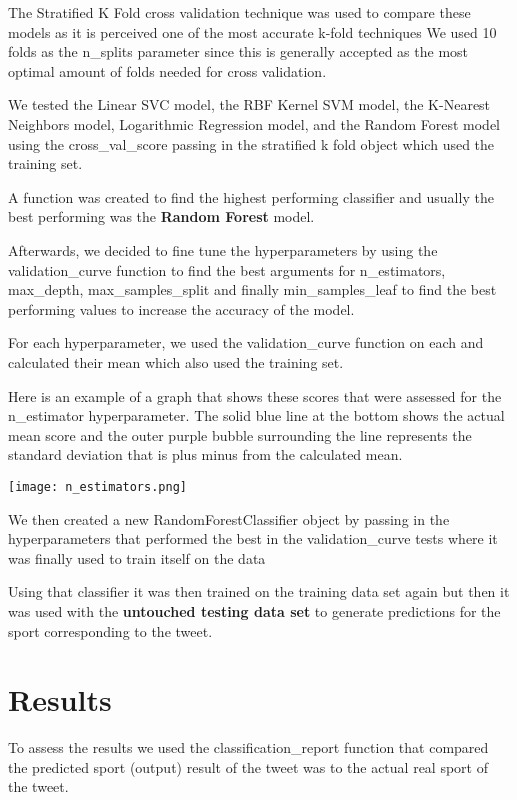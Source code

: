 \documentclass{article}
\begin{document}
\begin{enumerate}
    The Stratified K Fold cross validation technique was used to compare these models as it is perceived one of the most accurate k-fold techniques We used 10 folds as the n\_splits parameter since this is generally accepted as the most optimal amount of folds needed for cross validation.

    We tested the Linear SVC model, the RBF Kernel SVM model, the K-Nearest Neighbors model, Logarithmic Regression model, and the Random Forest model using the cross\_val\_score passing in the stratified k fold object which used the training set.

    A function was created to find the highest performing classifier and usually the best performing was the \textbf{Random Forest} model. 

    Afterwards, we decided to fine tune the hyperparameters by using the validation\_curve function to find the best arguments for n\_estimators, max\_depth, max\_samples\_split and finally min\_samples\_leaf to find the best performing values to increase the accuracy of the model.

    \indent For each hyperparameter, we used the validation\_curve function on each and calculated their mean which also used the training set.

    Here is an example of a graph that shows these scores that were assessed for the n\_estimator hyperparameter. The solid blue line at the bottom shows the actual mean score and the outer purple bubble surrounding the line represents the standard deviation that is plus minus from the calculated mean. 

    \texttt{[image: n\_estimators.png]}

    We then created a new RandomForestClassifier object by passing in the hyperparameters that performed the best in the validation\_curve tests where it was finally used to train itself on the data

    Using that classifier it was then trained on the training data set again but then it was used with the \textbf{untouched testing data set} to generate predictions for the sport corresponding to the tweet.
    
\end{enumerate}
\section{Results}
    To assess the results we used the classification\_report function that compared the predicted sport (output) result of the tweet was to the actual real sport of the tweet.
\end{document}
